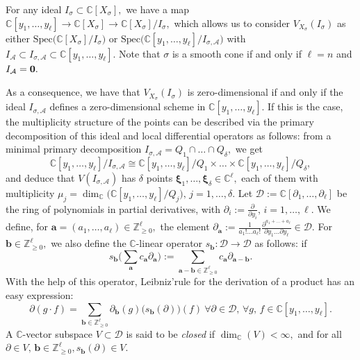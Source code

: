 \documentclass[a4paper,11pt]{amsart}
\newcommand{\C}{\mathbb{C}}
\newcommand{\Z}{\mathbb{Z}}
\newcommand{\cA}{{\mathcal A}}
\newcommand{\cD}{{\mathcal D}}
\newcommand{\bfa}{{\boldsymbol{a}}}
\newcommand{\bfb}{{\boldsymbol{b}}}
\newcommand{\bfxi}{{\boldsymbol{\xi}}}
\numberwithin{thm}{section}
\numberwithin{equation}{section}
\theoremstyle{definition}
\theoremstyle{plain}
\begin{document}
For any ideal $I_\sigma\subset\C[X_\sigma],$ we have a map $\C[y_1,\ldots, y_\ell]\to\C[X_\sigma]\to\C[X_\sigma]/I_\sigma,$ which allows us to consider $V_{X_\sigma}(I_\sigma)$ as either $\mbox{Spec}\big(\C[X_\sigma]/I_\sigma\big)$ or $\mbox{Spec}\big(\C[y_1,\ldots, y_\ell]/I_{\sigma,\cA}\big)$ with $I_\cA\subset I_{\sigma,\cA}\subset\C[y_1,\ldots, y_\ell].$ Note that $\sigma$ is a smooth cone if and only if $\ell=n$ and $I_\cA=\bf0.$

As a consequence, we have that $V_{X_\sigma}(I_\sigma)$ is zero-dimensional if and only if the ideal  $I_{\sigma,\cA}$ defines a zero-dimensional scheme in $\C[y_1,\ldots, y_\ell].$ If this is the case, the multiplicity structure of the points  can be described via the primary decomposition of this ideal and local differential operators as follows: from a minimal primary decomposition
$I_{\sigma,\cA}=Q_1\cap\ldots\cap Q_\delta,$ we get 
\begin{equation}\label{tcr}
\C[y_1,\ldots, y_\ell]/ I_{\sigma,\cA}\cong \C[y_1,\ldots, y_\ell]/Q_1\times\ldots\times\C[y_1,\ldots, y_\ell]/Q_\delta,
\end{equation}
and deduce that $V(I_{\sigma,\cA})$ has $\delta$ points $\bfxi_1,\ldots, \bfxi_\delta\in\C^\ell,$ each of them with multiplicity $\mu_j=\dim_\C\big(\C[y_1,\ldots, y_\ell]/Q_j\big),\,j=1,\ldots, \delta.$
Let $\cD:=\C[\partial_1,\ldots, \partial_\ell]$ be the ring of polynomials in partial derivatives, with $\partial_i:=\frac{\partial}{\partial y_i},\,i=1,\ldots,\ell.$ We define, for $\bfa=(a_1,\ldots, a_\ell)\in\Z_{\geq0}^\ell,$ the element 
$\partial_\bfa:=\frac{1}{a_1!\ldots a_\ell!}\frac{\partial^{a_1+\ldots+a_\ell}}{\partial y_1\ldots \partial y_\ell}\in\cD.$
For $\bfb\in\Z_{\geq0}^\ell,$ we also define the $\C$-linear operator $s_\bfb:\cD\to\cD$ as follows: if 
$$s_\bfb\Big(\sum_\bfa c_\bfa\partial_\bfa\Big):=\sum_{\bfa-\bfb\in\Z_{\geq0}^\ell}c_\bfa\partial_{\bfa-\bfb}.
$$
With the help of this operator, Leibniz'rule for the derivation of a product has an easy expression:
\begin{equation}\label{lbtz}
\partial(g\cdot f)=\sum_{\bfb\in\Z_{\geq0}^\ell} \partial_\bfb(g)\big(s_\bfb(\partial)\big)(f) \ \forall \partial\in\cD,\, \forall g,\,f\in\C[y_1,\ldots, y_\ell].
\end{equation}
A $\C$-vector subspace $V\subset\cD$ is said to be \textit{closed} if $\dim_\C(V)<\infty,$ and for all $\partial\in V,\, \bfb\in\Z_{\geq0}^\ell, s_\bfb(\partial)\in V.$
\end{document}
